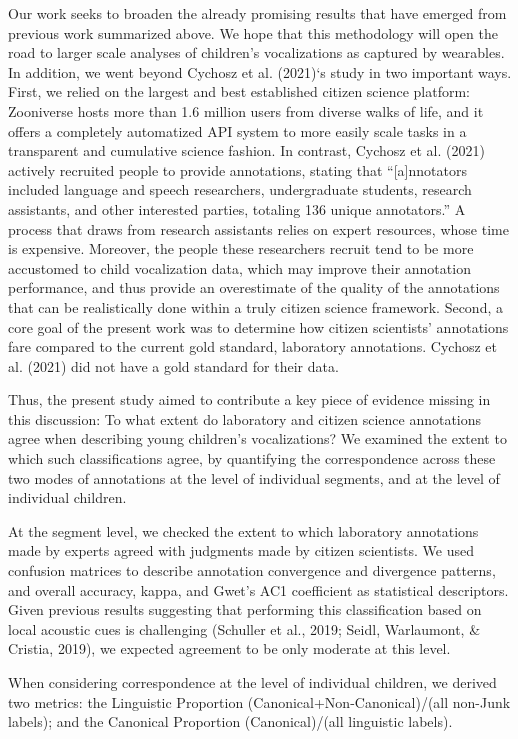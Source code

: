 \documentclass[
  english,
  ,man]{apa6}
\begin{document}
Our work seeks to broaden the already promising results that have emerged from previous work summarized above. We hope that this methodology will open the road to larger scale analyses of children's vocalizations as captured by wearables. In addition, we went beyond Cychosz et al. (2021)`s study in two important ways. First, we relied on the largest and best established citizen science platform: Zooniverse hosts more than 1.6 million users from diverse walks of life, and it offers a completely automatized API system to more easily scale tasks in a transparent and cumulative science fashion. In contrast, Cychosz et al. (2021) actively recruited people to provide annotations, stating that ``{[}a{]}nnotators included language and speech researchers, undergraduate students, research assistants, and other interested parties, totaling 136 unique annotators.'' A process that draws from research assistants relies on expert resources, whose time is expensive. Moreover, the people these researchers recruit tend to be more accustomed to child vocalization data, which may improve their annotation performance, and thus provide an overestimate of the quality of the annotations that can be realistically done within a truly citizen science framework. Second, a core goal of the present work was to determine how citizen scientists' annotations fare compared to the current gold standard, laboratory annotations. Cychosz et al. (2021) did not have a gold standard for their data.

Thus, the present study aimed to contribute a key piece of evidence missing in this discussion: To what extent do laboratory and citizen science annotations agree when describing young children's vocalizations? We examined the extent to which such classifications agree, by quantifying the correspondence across these two modes of annotations at the level of individual segments, and at the level of individual children.

At the segment level, we checked the extent to which laboratory annotations made by experts agreed with judgments made by citizen scientists. We used confusion matrices to describe annotation convergence and divergence patterns, and overall accuracy, kappa, and Gwet's AC1 coefficient as statistical descriptors. Given previous results suggesting that performing this classification based on local acoustic cues is challenging (Schuller et al., 2019; Seidl, Warlaumont, \& Cristia, 2019), we expected agreement to be only moderate at this level.

When considering correspondence at the level of individual children, we derived two metrics: the Linguistic Proportion (Canonical+Non-Canonical)/(all non-Junk labels); and the Canonical Proportion (Canonical)/(all linguistic labels).
\end{document}
